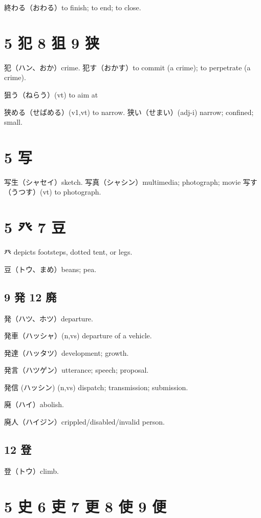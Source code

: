 終わる（おわる）to finish; to end; to close.

\section{5 犯 8 狙 9 狭}

犯（ハン、おか）crime.
犯す（おかす）to commit (a crime); to perpetrate (a crime).

狙う（ねらう）(vt) to aim at

狭める（せばめる）(v1,vt) to narrow.
狭い（せまい）(adj-i) narrow; confined; small.

\section{5 写}

写生（シャセイ）sketch.
写真（シャシン）multimedia; photograph; movie
写す（うつす）(vt) to photograph.

\section{5 癶 7 豆}

癶 depicts footsteps, dotted tent, or legs.

豆（トウ、まめ）beans; pea.

\subsection{9 発 12 廃}

発（ハツ、ホツ）departure.

発車（ハッシャ）(n,vs) departure of a vehicle.

発達（ハッタツ）development; growth.

発言（ハツゲン）utterance; speech; proposal.

発信 (ハッシン) (n,vs) dispatch; transmission; submission.

廃（ハイ）abolish.

廃人（ハイジン）crippled/disabled/invalid person.

\subsection{12 登}

登（トウ）climb.

\section{5 史 6 吏 7 更 8 使 9 便}

